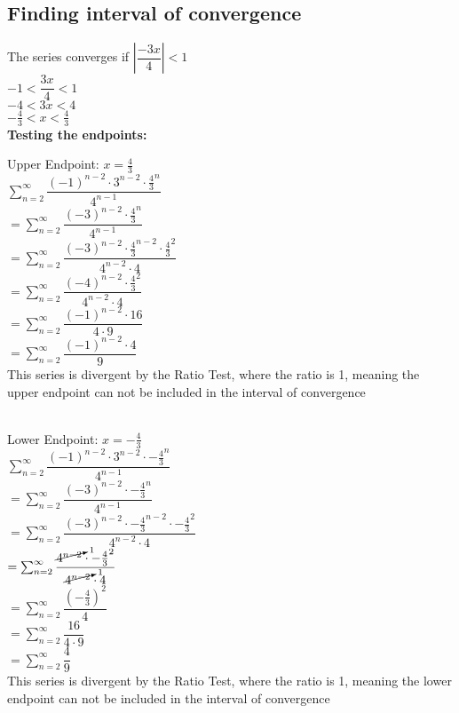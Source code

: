 \documentclass{article}
\begin{document}
\subsection*{Finding interval of convergence}
The series converges if $\left|   \dfrac{-3x}{4} \right| < 1$
\\[0.1in] $-1< \dfrac{3x}{4} < 1$
\\[0.1in] $-4< 3x < 4$
\\[0.1in] $-\frac{4}{3}< x < \frac{4}{3}$
\\[0.1in]\textbf{Testing the endpoints:}
\begin{multicols*}{2}
    Upper Endpoint: $x=\frac{4}{3}$
    \\[0.05in]$ \sum_{n=2}^{\infty}\dfrac{(-1)^{n-2}\cdot3^{n-2}\cdot \frac{4}{3}^{n}}{4^{n-1}}$
    \\[0.05in]$ =\sum_{n=2}^{\infty}\dfrac{(-3)^{n-2}\cdot \frac{4}{3}^{n}}{4^{n-1}}$
    \\[0.05in]$ =\sum_{n=2}^{\infty}\dfrac{(-3)^{n-2}\cdot \frac{4}{3}^{n-2} \cdot \frac{4}{3}^2}{4^{n-2}\cdot4}$
    \\[0.05in]$ =\sum_{n=2}^{\infty}\dfrac{(-4)^{n-2}\cdot \frac{4}{3}^2}{4^{n-2}\cdot4}$
    \\[0.05in]$ =\sum_{n=2}^{\infty}\dfrac{(-1)^{n-2}\cdot {16}}{4\cdot 9}$
    \\[0.05in]$ =\sum_{n=2}^{\infty}\dfrac{(-1)^{n-2}\cdot {4}}{ 9}$
    \\[0.05in]This series is divergent by the Ratio Test, where the ratio is 1, meaning the upper endpoint can not be included in the interval of convergence
    \\[0.5in]\\
    \vfill\null
    \columnbreak

    Lower Endpoint: $x=-\frac{4}{3}$
    \\[0.05in]$ \sum_{n=2}^{\infty}\dfrac{(-1)^{n-2}\cdot3^{n-2}\cdot -\frac{4}{3}^{n}}{4^{n-1}}$
    \\[0.05in]$ =\sum_{n=2}^{\infty}\dfrac{(-3)^{n-2}\cdot -\frac{4}{3}^{n}}{4^{n-1}}$
    \\[0.05in]$ =\sum_{n=2}^{\infty}\dfrac{(-3)^{n-2}\cdot -\frac{4}{3}^{n-2} \cdot -\frac{4}{3}^2}{4^{n-2}\cdot4}$
    \\[0.05in]$ =\sum_{n=2}^{\infty}\dfrac{\cancelto{1}{4^{n-2}}\cdot -\frac{4}{3}^2}{\cancelto{1}{4^{n-2}}\cdot4}$
    \\[0.05in]$ =\sum_{n=2}^{\infty}\dfrac{\left( -\frac{4}{3}\right)^2}{4}$
    \\[0.05in]$ =\sum_{n=2}^{\infty}\dfrac{16}{4\cdot 9}$
    \\[0.05in]$ =\sum_{n=2}^{\infty}\dfrac{4}{9}$
    \\[0.05in]This series is divergent by the Ratio Test, where the ratio is 1, meaning the lower endpoint can not be included in the interval of convergence
    \pagebreak
\end{multicols*}
\end{document}
